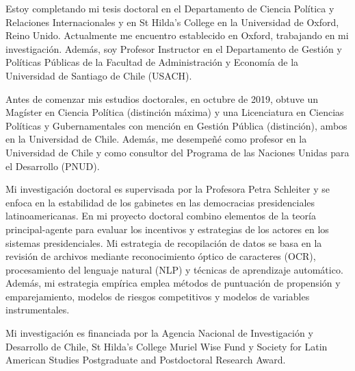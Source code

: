 




\vspace{3mm}

\begin{cvparagraph}

Estoy completando mi tesis doctoral en el Departamento de Ciencia Política y Relaciones Internacionales y en St Hilda’s College en la Universidad de Oxford, Reino Unido. Actualmente me encuentro establecido en Oxford, trabajando en mi investigación. Además, soy Profesor Instructor en el Departamento de Gestión y Políticas Públicas de la Facultad de Administración y Economía de la Universidad de Santiago de Chile (USACH).

Antes de comenzar mis estudios doctorales, en octubre de 2019, obtuve un Magíster en Ciencia Política (distinción máxima) y una Licenciatura en Ciencias Políticas y Gubernamentales con mención en Gestión Pública (distinción), ambos en la Universidad de Chile. Además, me desempeñé como profesor en la Universidad de Chile y como consultor del Programa de las Naciones Unidas para el Desarrollo (PNUD).

Mi investigación doctoral es supervisada por la Profesora Petra Schleiter y se enfoca en la estabilidad de los gabinetes en las democracias presidenciales latinoamericanas. En mi proyecto doctoral combino elementos de la teoría principal-agente para evaluar los incentivos y estrategias de los actores en los sistemas presidenciales. Mi estrategia de recopilación de datos se basa en la revisión de archivos mediante reconocimiento óptico de caracteres (OCR), procesamiento del lenguaje natural (NLP) y técnicas de aprendizaje automático. Además, mi estrategia empírica emplea métodos de puntuación de propensión y emparejamiento, modelos de riesgos competitivos y modelos de variables instrumentales. 

Mi investigación es financiada por la Agencia Nacional de Investigación y Desarrollo de Chile, St Hilda's College Muriel Wise Fund y Society for Latin American Studies Postgraduate and Postdoctoral Research Award.
\vspace{1mm}
\end{cvparagraph}